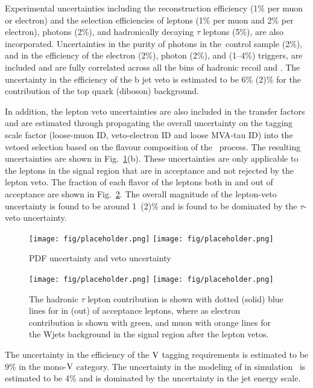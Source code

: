 Experimental uncertainties including the reconstruction efficiency
(1\% per muon or electron) and the selection efficiencies of leptons
(1\% per muon and 2\% per electron), photons (2\%), and hadronically
decaying $\tau$ leptons (5\%), are also incorporated.
Uncertainties in the purity of photons
in the~\phojets control sample (2\%), and in the efficiency of the electron (2\%),
photon (2\%), and \ptmiss (1--4\%) triggers, are included and are fully correlated
across all the bins of hadronic recoil \pt and \ptmiss. 
The uncertainty in the efficiency of the b jet
veto is estimated to be 6\% (2)\% for the contribution of the top quark (diboson) background.

In addition, the lepton veto uncertainties are also included 
in the transfer factors and are estimated through propagating the
overall uncertainty on the tagging scale factor (loose-muon ID, 
veto-electron ID and loose MVA-tau ID) into the vetoed selection 
based on the flavour composition of the \Wjets~process. 
The resulting uncertainties are shown in Fig.~\ref{fig:wjet_unc}(b). These uncertainties 
are only applicable to the leptons in the signal region that are in 
acceptance and not rejected by the lepton veto. 
The fraction of each flavor of the leptons both in and out 
of acceptance are shown in Fig.~\ref{fig:wjet_unc_accp}. 
The overall magnitude of the lepton-veto uncertainty is found to be around 1~(2)\% and is found to 
be dominated by the $\tau$-veto uncertainty. 

\begin{figure}[!htb]
\begin{center}
\texttt{[image: fig/placeholder.png]}
\texttt{[image: fig/placeholder.png]}
\caption{PDF uncertainty and veto uncertainty}
\label{fig:wjet_unc}
\end{center}\end{figure}

\begin{figure}[!htb]
\begin{center}
\texttt{[image: fig/placeholder.png]}
\texttt{[image: fig/placeholder.png]}
\caption{The hadronic $\tau$ lepton contribution is shown with dotted (solid) blue lines for in
(out) of acceptance leptons, where as electron contribution is shown with green, and muon
with orange lines for the Wjets background in the signal region after the lepton vetos.}
\label{fig:wjet_unc_accp}
\end{center}\end{figure}

The uncertainty in the efficiency of the $\mathrm{V}$
tagging requirements is estimated to be 9\% in the mono-$\mathrm{V}$ category.
The uncertainty in the modeling of \ptmiss in simulation~\cite{Khachatryan:2014gga}
is estimated to be 4\% and is dominated by the uncertainty in the jet energy scale.

